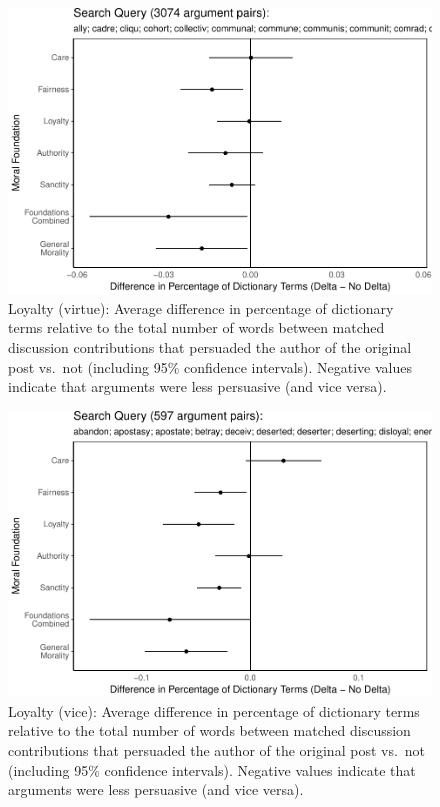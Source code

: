 \documentclass[12pt,]{article}
\begin{document}
\begin{figure}
\centering
\includegraphics{prelim_files/figure-latex/ingroup virtue-1.pdf}
\caption{Loyalty (virtue): Average difference in percentage of
dictionary terms relative to the total number of words between matched
discussion contributions that persuaded the author of the original post
vs.~not (including 95\% confidence intervals). Negative values indicate
that arguments were less persuasive (and vice versa).}
\end{figure}

\begin{figure}
\centering
\includegraphics{prelim_files/figure-latex/ingroup vice-1.pdf}
\caption{Loyalty (vice): Average difference in percentage of dictionary
terms relative to the total number of words between matched discussion
contributions that persuaded the author of the original post vs.~not
(including 95\% confidence intervals). Negative values indicate that
arguments were less persuasive (and vice versa).}
\end{figure}
\end{document}
